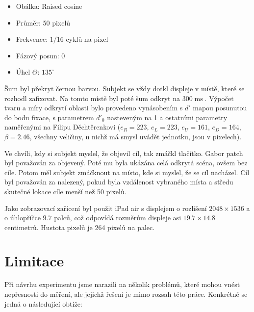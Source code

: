 \begin{itemize}
\item Obálka: Raised cosine
\item Průměr: 50 pixelů
\item Frekvence: $1/16$ cyklů na pixel
\item Fázový posun: 0
\item Úhel $\Theta$: $135^\circ$ 
\end{itemize}

Šum byl překryt černou barvou. Subjekt se vždy dotkl displeje v místě, které se
rozhodl zafixovat. Na tomto místě byl poté šum odkryt na $300
\operatorname{ms}$. Výpočet tvaru a míry odkrytí oblasti bylo provedeno vynásobením s $d'$ mapou
posunutou do bodu fixace, s parametrem $d'_0$ nasteveným na 1 a ostatními
parametry naměřenými na Filipu Děchtěrenkovi ($e_R=223$, $e_L=223$, $e_U =
161$, $e_D = 164$, $\beta=2.46$, všechny veličiny, u nichž má smysl uvádět
jednotku, jsou v pixelech).

Ve chvíli, kdy si subjekt myslel, že objevil cíl, tak zmáčkl tlačítko. Gabor
patch byl považován za objevený. Poté mu byla ukázána celá odkrytá scéna, ovšem
bez cíle. Potom měl subjekt zmáčknout na místo, kde si myslel, že se cíl
nacházel. Cíl byl považován za nalezený, pokud byla vzdálenost vybraného místa
a středu skutečné lokace cíle menší než 50 pixelů. 

Jako zobrazovací zařícení byl použit iPad air s displejem o rozlišení
$2048\times1536$ a o úhlopříčce $9.7$ palců, což odpovídá rozměrům displeje asi
$19.7 \times 14.8$ centimetrů. Hustota pixelů je 264 pixelů na palec. 

\section{Limitace}

Při návrhu experimentu jsme narazili na několik problémů, které mohou vnést
nepřesnosti do měření, ale jejichž řešení je mimo rozsah této práce. Konkrétně
se jedná o následující obtíže:

